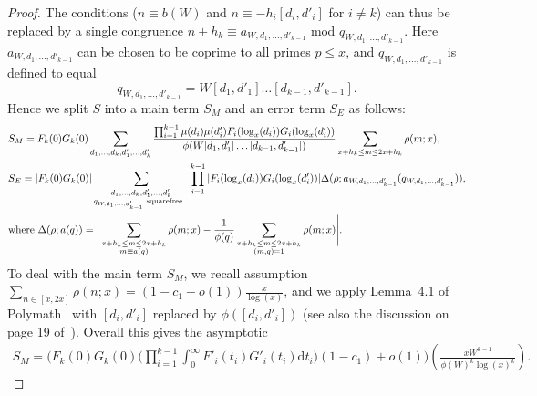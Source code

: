 \documentclass{amsart}
\numberwithin{equation}{section}
\begin{document}
\begin{proof}
  The conditions ($n \equiv b (W)$ and $n \equiv -h_i [d_i, d'_i] $ for $i \neq k$) can thus be replaced by a single congruence $n + h_k \equiv a_{W,d_1, \dots, d'_{k-1}} \mbox{ mod } q_{W,d_1, \dots, d'_{k-1}} $.  Here $a_{W,d_1, \dots, d'_{k-1}}$ can be chosen to be coprime to all primes $p \leq x$, and $q_{W,d_1, \dots, d'_{k-1}}$ is defined to equal
  $$q_{W,d_1, \dots, d'_{k-1}}  = W [d_1,d'_1] \dots [d_{k-1},d'_{k-1}].$$
  Hence we split $S$ into a main term $S_M$ and an error term $S_E$  as follows:
  \begin{align*}
  &S_{M} =  F_{k}(0) G_{k}(0) \sum_{d_1, \dots, d_k, d'_1, \dots, d'_k }  \frac{\prod_{i=1}^{k-1}  \mu(d_i) \mu(d'_i) F_i(\log_x(d_i))  G_i(\log_x(d'_i))}{ \phi( W[d_1,d'_1] \dots [d_{k-1},d'_{k-1}])} \sum_{\substack{x+h_k \leq m \leq 2x+h_k  }}  \rho(m; x), \\
  &S_{E} = | F_{k}(0) G_{k}(0)| \sum_{\substack{d_1, \dots, d_k, d'_1, \dots, d'_k \\ q_{W,d_1, \dots, d'_{k-1}} \mbox{\begin{scriptsize}
   squarefree
  \end{scriptsize} } }} \prod_{i=1}^{k-1}    |F_i(\log_x(d_i))  G_i(\log_x(d'_i))| \Delta(\rho;  a_{W,d_1, \dots, d'_{k-1}} (q_{W,d_1, \dots, d'_{k-1}})), \\
  &\mbox{where } \Delta(\rho;  a (q)) = \Bigg|  \sum_{\substack{x+h_k \leq m \leq 2x+h_k \\ m \equiv a (q)  }}  \rho(m; x) -  \frac{1}{\phi(q)} \sum_{\substack{x+h_k \leq m \leq 2x+h_k  \\ (m,q)=1   }}  \rho(m; x) \Bigg|.
  \end{align*}
  To deal with the main term $S_M$, we recall assumption $\sum_{n \in [x,2x]} \rho(n;x) = (1-c_1 +o(1)) \frac{x}{\log(x)}$, and we apply Lemma~4.1 of Polymath~\cite{Polymath:2014:VSS} with $[d_i,d'_i]$ replaced by $\phi([d_i,d'_i])$ (see also the discussion on page 19 of~\cite{Polymath:2014:VSS}). Overall this gives the asymptotic
  \begin{align*} 
  S_{M} =  \Bigg(  F_{k}(0) G_{k}(0) \Bigg( \prod_{i=1}^{k-1} \int_0^\infty F'_i(t_i) G'_i(t_i) \mbox{d}t_i \Bigg) (1-c_1)  +o(1) \Bigg)\left( \frac{ xW^{k-1}}{\phi(W)^{k} \log(x)^{k}}\right) .
  \end{align*}
  

\end{proof}
\end{document}
